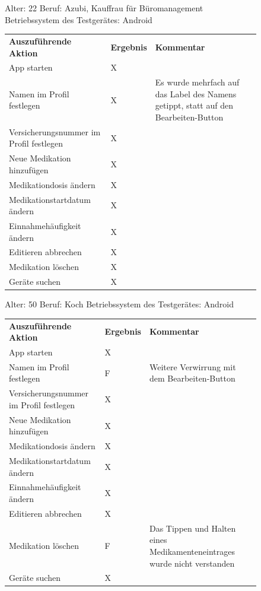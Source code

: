 \documentclass[a4paper]{scrreprt}
\begin{document}
\begin{figure}
Alter: 22 \newline
Beruf: Azubi, Kauffrau für Büromanagement \newline
Betriebssystem des Testgerätes: Android \newline \newline
 \begin{tabular}{ |l|l| p{6cm} }
  \textbf{Auszuführende Aktion} & \textbf{Ergebnis} & \textbf{Kommentar} \\
App starten & X & \\
Namen im Profil festlegen & X & Es wurde mehrfach auf das Label des Namens getippt, statt auf den Bearbeiten-Button \\
Versicherungsnummer im Profil festlegen & X & \\
Neue Medikation hinzufügen & X & \\
Medikationdosis ändern & X & \\
Medikationstartdatum ändern & X & \\
Einnahmehäufigkeit ändern & X & \\
Editieren abbrechen & X & \\
Medikation löschen & X & \\
Geräte suchen & X & \\
 \end{tabular}
 \newline
 \newline
 \newline
 \end{figure}
 \begin{figure}
 
 Alter: 50 \newline
Beruf: Koch \newline
Betriebssystem des Testgerätes: Android \newline \newline
 \begin{tabular}{ |l|l| p{6cm} }
  \textbf{Auszuführende Aktion} & \textbf{Ergebnis} & \textbf{Kommentar} \\
App starten & X & \\
Namen im Profil festlegen & F & Weitere Verwirrung mit dem Bearbeiten-Button \\
Versicherungsnummer im Profil festlegen & X & \\
Neue Medikation hinzufügen & X & \\
Medikationdosis ändern & X & \\
Medikationstartdatum ändern & X & \\
Einnahmehäufigkeit ändern & X & \\
Editieren abbrechen & X & \\
Medikation löschen & F & Das Tippen und Halten eines Medikamenteneintrages wurde nicht verstanden\\
Geräte suchen & X & \\
\end{tabular}
 \newline
 \newline
 \newline
 \end{figure}
\end{document}

